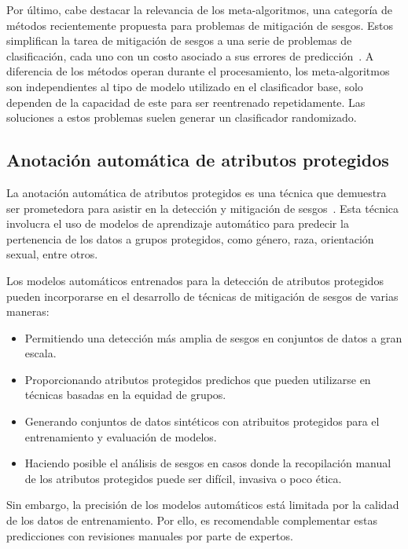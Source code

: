 Por \'ultimo, cabe destacar la relevancia de los meta-algoritmos, una categor\'ia de m\'etodos recientemente propuesta para problemas de 
mitigaci\'on de sesgos. Estos simplifican la tarea de mitigaci\'on de sesgos a una serie de problemas de clasificaci\'on, cada uno con 
un costo asociado a sus errores de predicci\'on~\parencite{agarwal2018reductions, agarwal2019fair}.
A diferencia de los m\'etodos operan durante el procesamiento, los meta-algoritmos son independientes al tipo de modelo utilizado en el 
clasificador base, solo dependen de la capacidad de este para ser reentrenado repetidamente. Las soluciones a estos problemas suelen generar
un clasificador randomizado.

\subsection{Anotaci\'on autom\'atica de atributos protegidos}
La anotaci\'on autom\'atica de atributos protegidos es una t\'ecnica que demuestra ser prometedora para asistir en la detecci\'on y 
mitigaci\'on de sesgos~\parencite{soumah2023radar,dinan2020multidimensional,10.1007/978-3-031-35320-8_39,6906255,Rajendra_2021}. 
Esta t\'ecnica involucra el uso de modelos de aprendizaje autom\'atico para predecir la pertenencia de los datos a grupos protegidos, 
como g\'enero, raza, orientaci\'on sexual, entre otros. 

Los modelos autom\'aticos entrenados para la detecci\'on de atributos protegidos pueden incorporarse en el desarrollo de t\'ecnicas
de mitigaci\'on de sesgos de varias maneras:
\begin{itemize}
    \item Permitiendo una detecci\'on m\'as amplia de sesgos en conjuntos de datos a gran escala.
    \item Proporcionando atributos protegidos predichos que pueden utilizarse en t\'ecnicas basadas en 
    la equidad de grupos.
    \item Generando conjuntos de datos sint\'eticos con atribuitos protegidos para el entrenamiento y evaluaci\'on de 
    modelos.
    \item Haciendo posible el an\'alisis de sesgos en casos donde la recopilaci\'on manual de los atributos protegidos
    puede ser dif\'icil, invasiva o poco \'etica.
\end{itemize}

Sin embargo, la precisi\'on de los modelos autom\'aticos est\'a limitada por la calidad de los datos de entrenamiento. Por ello, es 
recomendable complementar estas predicciones con revisiones manuales por parte de expertos.
 
